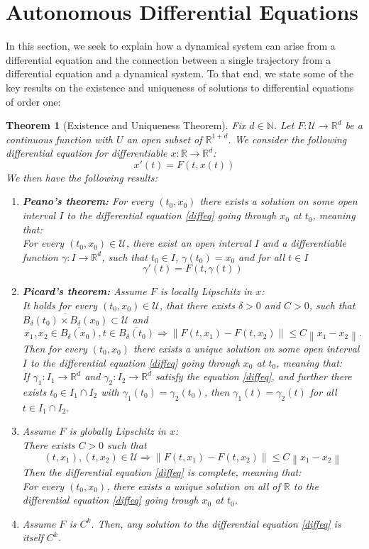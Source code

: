 \documentclass[11pt, a4paper]{memoir}
\theoremstyle{break}
\newtheorem{thm}{Theorem}
\theoremstyle{break}
\theoremstyle{nonumberplain}
\newcommand{\mN}{\mathbb{N}}
\newcommand{\mR}{\mathbb{R}}
\newcommand{\norm}[1]{\left\lVert#1\right\rVert}
\begin{document}
\section{Autonomous Differential Equations}
In this section, we seek to explain how a dynamical system can arise from a differential equation and the connection between a single trajectory from a differential equation and a dynamical system. To that end, we state some of the key results on the existence and uniqueness of solutions to differential equations of order one:
\begin{thm}[Existence and Uniqueness Theorem]\label{ThmDiffEq}
Fix $d\in \mN$. Let $F:\mathcal{U}\to\mR^d$ be a continuous function with $U$ an open subset of $\mR^{1+d}$. We consider the following differential equation for differentiable $x:\mR\to\mR^{d}$:
\begin{equation}\label{diffeq}
x'(t)=F\left(t,x(t)\right)
\end{equation}
We then have the following results:
\begin{enumerate}[label=(\roman*)]
	\item \textbf{Peano's theorem:} For every $(t_0,x_0)$ there exists a solution on some open interval $I$ to the differential equation \ref{diffeq} going through $x_0$ at $t_0$, meaning that:\\
	For every $(t_0,x_0)\in \mathcal{U}$, there exist an open interval $I$ and a differentiable function $\gamma: I\to \mR^d$, such that $t_0\in I$, $\gamma(t_0)=x_0$ and for all $t\in I$
		$$\gamma'(t)=F\left(t,\gamma(t)\right)$$
	\item \textbf{Picard's theorem:} Assume $F$ is locally Lipschitz in $x$:\\[5pt]
	It holds for every $(t_0,x_0)\in \mathcal{U}$, that there exists $\delta>0$ and $C>0$, such that $\overline{B_\delta(t_0)\times B_\delta(x_0)}\subset \mathcal{U}$ and
	$$x_1,x_2\in \overline{B_\delta(x_0)}, t\in \overline{B_\delta(t_0)}\Rightarrow \norm{F(t,x_1)-F(t,x_2)}\leqslant C\norm{x_1-x_2}.$$
	Then for every $(t_0,x_0)$ there exists a unique solution on some open interval $I$ to the differential equation \ref{diffeq} going through $x_0$ at $t_0$, meaning that:\\
	If $\gamma_1: I_1\to\mR^d$ and $\gamma_2:I_2\to\mR^d$ satisfy the equation \ref{diffeq}, and further there exists $t_0\in I_1\cap I_2$ with $\gamma_1(t_0)=\gamma_2(t_0)$, then $\gamma_1(t)=\gamma_2(t)$ for all $t\in I_1\cap I_2$.
	\item Assume $F$ is globally Lipschitz in $x$:\\[5pt]
	There exists $C>0$ such that
	$$(t,x_1),(t,x_2)\in \mathcal{U}\Rightarrow \norm{F(t,x_1)-F(t,x_2)}\leq C\norm{x_1-x_2}$$
	Then the differential equation \ref{diffeq} is complete, meaning that:\\
	For every $(t_0,x_0)$, there exists a unique solution on all of $\mR$ to the differential equation \ref{diffeq} going trough $x_0$ at $t_0$.
	\item Assume $F$ is $C^k$. Then, any solution to the differential equation \ref{diffeq} is itself $C^k$.
\end{enumerate}
\end{thm}
\end{document}
